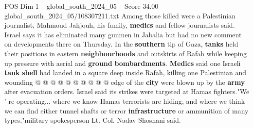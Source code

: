 \begin{textsample}{POS Dim 1 – global\_south\_2024\_05 – Score 34.00 – global\_south\_2024\_05/108307211.txt}
Among those killed were a Palestinian journalist, Mahmoud Jahjouh, his family, \textbf{medics} and fellow journalists said.
Israel says it has eliminated many gunmen in Jabalia but had no new comment on developments there on Thursday.
In the \textbf{southern} tip of Gaza, \textbf{tanks} held their positions in eastern \textbf{neighbourhoods} and outskirts of Rafah while keeping up pressure with aerial and \textbf{ground} \textbf{bombardments}. \textbf{Medics} said one Israeli \textbf{tank} \textbf{shell} had landed in a square deep inside Rafah, killing one Palestinian and wounding @ @ @ @ @ @ @ @ @ @ edge of the \textbf{city} were blown up by the \textbf{army} after evacuation orders.
Israel said its strikes were targeted at Hamas fighters."We ' re operating... where we know Hamas terrorists are hiding, and where we think we can find either tunnel shafts or terror \textbf{infrastructure} or ammunition of many types,"military spokesperson Lt.
Col.
Nadav Shoshani said.

\end{textsample}
